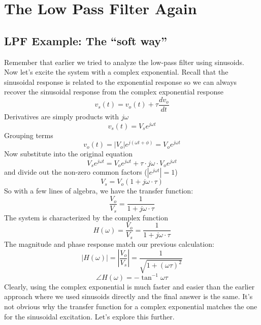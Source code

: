 \section{The Low Pass Filter Again}
\subsection{LPF Example:  The ``soft way''}
Remember that earlier we tried to analyze the low-pass filter using sinusoids.  Now let's excite the system with a complex exponential.  Recall that the sinusoidal response is related to the exponential response so we can always recover the sinusoidal response from the complex exponential response
    \begin{equation}
        v_s(t) = v_o(t) + \tau \frac{dv_o}{dt}
    \end{equation}
Derivatives are simply products with $j\omega$
    \begin{equation}
        v_s(t) = V_s e^{j\omega t}
    \end{equation}
Grouping terms
    \begin{equation}
        v_o(t) = |V_o| e^{j (\omega t + \phi)} = V_o e^{j\omega t}
    \end{equation}
Now substitute into the original equation
    \begin{equation}
        V_s e^{j \omega t} = V_o e^{j \omega t}  + \tau \cdot j\omega \cdot V_o e^{j \omega t}
    \end{equation}
and divide out the non-zero common factors ($|e^{j\omega t} | = 1$)
    \begin{equation}
        V_s = V_o ( 1 + j \omega \cdot \tau)
    \end{equation}
So with a few lines of algebra, we have the transfer function:
    \begin{equation}
        \frac{V_o}{V_s} = \frac{1}{1 + j\omega \cdot \tau}
    \end{equation}
The system is characterized by the complex function
    \begin{equation}
        H(\omega) = \frac{V_o}{V_s} = \frac{1}{1 + j\omega \cdot \tau}
    \end{equation}
The magnitude and phase response match our previous calculation:
    \begin{equation}
        | H(\omega) | = \left|\frac{V_o}{V_s}\right| = \frac{1}{\sqrt{1 + (\omega \tau)^2}}
    \end{equation}
    \begin{equation}
        \angle H(\omega) = - \tan^{-1} \omega \tau
    \end{equation}
Clearly, using the complex exponential is much faster and easier than the earlier approach where we used sinusoids directly and the final answer is the same.  It's not obvious why the transfer function for a complex exponential matches the one for the sinusoidal excitation.  Let's explore this further.
